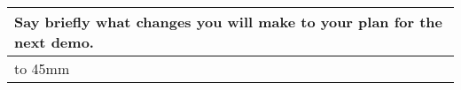 \documentclass[a4paper]{article}
\newcommand{\colWidth}{141mm}
\begin{document}
\begin{center}

\begin{tabular}{|p{\colWidth}|}
	\hline
	\cellcolor{blue!25}\large
	\textbf{Say briefly what changes you will make to your plan for the next demo.}
	\\ \hline
	\vtop to 45mm{

  }
  \\
  \hline
\end{tabular}

\end{center}
  
\end{document}
